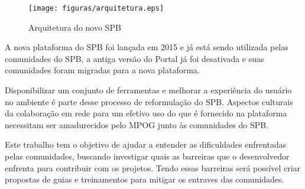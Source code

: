 \begin{figure}[h]
	\centering
	\label{arquitetura}
		\texttt{[image: figuras/arquitetura.eps]}
	\caption{Arquitetura do novo SPB}
\end{figure}


A nova plataforma do SPB foi lançada em 2015 e já está sendo utilizada pelas comunidades
do SPB, a antiga versão do Portal já foi desativada e suas comunidades foram 
migradas para a nova plataforma. 

Disponibilizar um conjunto de ferramentas e melhorar a experiência do usuário no 
ambiente é parte desse processo de reformulação do SPB. Aspectos culturais 
da colaboração em rede para um efetivo uso do que é fornecido na plataforma 
necessitam ser amadurecidos pelo MPOG junto às comunidades do SPB.

Este trabalho tem o objetivo de ajudar a entender as dificuldades enfrentadas
pelas comunidades, buscando investigar quais as barreiras que o desenvolvedor 
enfrenta para contribuir com os projetos. Tendo essas barreiras será possível
criar propostas de guias e treinamentos para mitigar os entraves das comunidades.  

